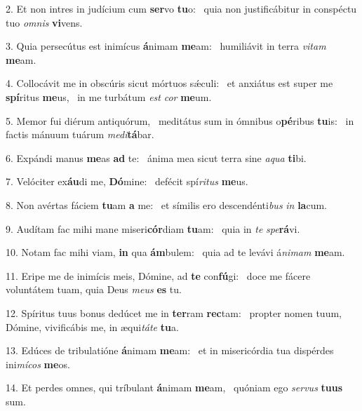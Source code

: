 2. Et non intres in judícium cum \textbf{ser}vo \textbf{tu}o: \ast\  quia non justificábitur in conspéctu tuo \textit{om}\textit{nis} \textbf{vi}vens.\

3. Quia persecútus est inimícus \textbf{á}nimam \textbf{me}am: \ast\  humiliávit in terra \textit{vi}\textit{tam} \textbf{me}am.\

4. Collocávit me in obscúris sicut mórtuos sǽculi: \dag\  et anxiátus est super me \textbf{spí}ritus \textbf{me}us, \ast\  in me turbátum \textit{est} \textit{cor} \textbf{me}um.\

5. Memor fui diérum antiquórum, \dag\  meditátus sum in ómnibus o\textbf{pé}ribus \textbf{tu}is: \ast\  in factis mánuum tuárum \textit{me}\textit{di}\textbf{tá}bar.\

6. Expándi manus \textbf{me}as \textbf{ad} te: \ast\  ánima mea sicut terra sine \textit{a}\textit{qua} \textbf{ti}bi.\

7. Velóciter ex\textbf{áu}di me, \textbf{Dó}mine: \ast\  defécit spí\textit{ri}\textit{tus} \textbf{me}us.\

8. Non avértas fáciem \textbf{tu}am \textbf{a} me: \ast\  et símilis ero descendénti\textit{bus} \textit{in} \textbf{la}cum.\

9. Audítam fac mihi mane miseri\textbf{cór}diam \textbf{tu}am: \ast\  quia in \textit{te} \textit{spe}\textbf{rá}vi.\

10. Notam fac mihi viam, \textbf{in} qua \textbf{ám}bulem: \ast\  quia ad te levávi á\textit{ni}\textit{mam} \textbf{me}am.\

11. Eripe me de inimícis meis, Dómine, ad \textbf{te} con\textbf{fú}gi: \ast\  doce me fácere voluntátem tuam, quia Deus \textit{me}\textit{us} \textbf{es} tu.\

12. Spíritus tuus bonus dedúcet me in \textbf{ter}ram \textbf{rec}tam: \ast\  propter nomen tuum, Dómine, vivificábis me, in æqui\textit{tá}\textit{te} \textbf{tu}a.\

13. Edúces de tribulatióne \textbf{á}nimam \textbf{me}am: \ast\  et in misericórdia tua dispérdes ini\textit{mí}\textit{cos} \textbf{me}os.\

14. Et perdes omnes, qui tríbulant \textbf{á}nimam \textbf{me}am, \ast\  quóniam ego \textit{ser}\textit{vus} \textbf{tu}\textbf{us} sum.\


